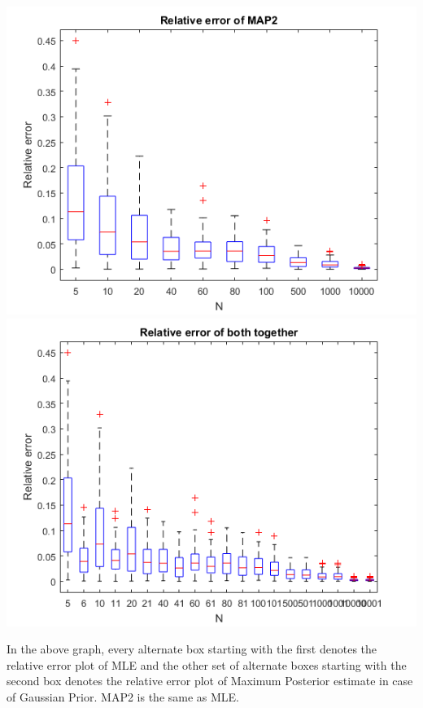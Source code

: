 \documentclass{article}
\begin{document}
\begin{enumerate}
\begin{center}
	\includegraphics[scale=0.8]{p1_map2.png}
	\includegraphics[scale=0.8]{p1_both.png}
\end{center} 

In the above graph, every alternate box starting with the first denotes the relative error plot of MLE
and the other set of alternate boxes starting with the second box denotes the relative error plot of Maximum Posterior estimate in case of Gaussian Prior. MAP2 is the same as MLE. 



\end{enumerate}
\end{document}
